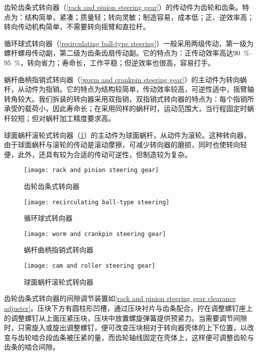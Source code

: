 \documentclass[UTF8]{ctexart}
\numberwithin{figure}{section}
\numberwithin{table}{section}
\begin{document}
齿轮齿条式转向器（\cref{rack and pinion steering gear}）的传动件为齿轮和齿条。特点为：结构简单，紧凑；质量轻；转向灵敏；制造容易，成本低；正、逆效率高；转向传动机构简单，不需要转向摇臂和直拉杆。

循环球式转向器（\cref{recirculating ball-type steering}）一般采用两级传动，第一级为螺杆螺母传动副，第二级为齿条齿扇传动副。它的特点为：正传动效率高达\qtyrange[range-phrase = $\,\sim\,$, range-units = single]{90}{95}{\percent}，转向省力；寿命长，工作平稳；但逆效率也很高，容易打手。

蜗杆曲柄指销式转向器（\cref{worm and crankpin steering gear}）的主动件为转向蜗杆，从动件为指销。它的特点为结构较简单，传动效率较高，可逆性适中，摇臂轴转角较大。我们拆装的转向器采用双指销，双指销式转向器的特点为：每个指销所承受的载荷小，因此寿命长；在采用同样的蜗杆时，运动范围大，当行程固定时蜗杆较短；但对蜗杆加工精度要求高。

球面蜗杆滚轮式转向器（\cref{cam and roller steering gear}）的主动件为球面蜗杆，从动件为滚轮。这种转向器，由于球面蜗杆与滚轮的传动是滚动摩擦，可减少转向器的磨损，同时也使转向轻便，此外，还具有较为合适的传动可逆性，但制造较为复杂。

\begin{figure}[htbp]
	\centering
	\begin{minipage}[b]{0.4\textwidth}
		\centering
		\texttt{[image: rack and pinion steering gear]}
		\caption{齿轮齿条式转向器}
		\label{rack and pinion steering gear}
	\end{minipage}
	\begin{minipage}[b]{0.5\textwidth}
		\centering
		\texttt{[image: recirculating ball-type steering]}
		\caption{循环球式转向器}
		\label{recirculating ball-type steering}
	\end{minipage}
	\begin{minipage}[b]{0.4\textwidth}
		\centering
		\texttt{[image: worm and crankpin steering gear]}
		\caption{蜗杆曲柄指销式转向器}
		\label{worm and crankpin steering gear}
	\end{minipage}
	\begin{minipage}[b]{0.5\textwidth}
		\centering
		\texttt{[image: cam and roller steering gear]}
		\caption{球面蜗杆滚轮式转向器}
		\label{cam and roller steering gear}
	\end{minipage}
\end{figure}

齿轮齿条式转向器的间隙调节装置如\cref{rack and pinion steering gear clearance adjuster}。压块下方有圆柱形凹槽，通过压块衬片与齿条配合，拧在调整螺钉座上的调整螺钉从上面压紧压块，压块中放置螺旋弹簧提供预紧力。当需要调节间隙时，只需旋入或旋出调整螺钉，便可改变压块相对于转向器壳体的上下位置，以改变与齿轮啮合段齿条被压紧的量，而齿轮轴线固定在壳体上，这样便可调整齿轮与齿条的啮合间隙。
\end{document}
